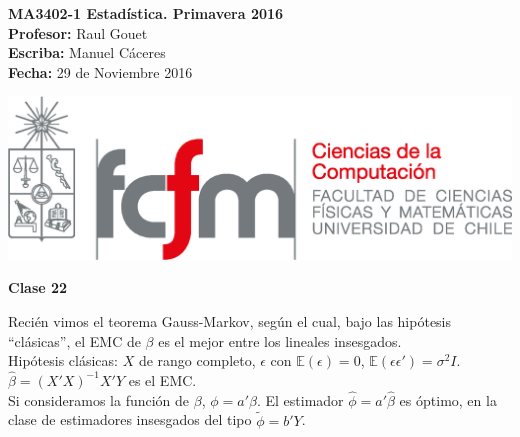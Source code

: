 \documentclass[10pt]{article}
\theoremstyle{plain}
\theoremstyle{definition}
\newcommand{\catnum}{22} %
\newcommand{\fecha}{29 de Noviembre 2016 }
\begin{document}
\vspace*{-1.2 cm}
\begin{minipage}{0.6\textwidth}
\begin{flushleft}
\hspace*{-0.5cm}\textbf{MA3402-1 Estadística. Primavera 2016}\\
\hspace*{-0.5cm}\textbf{Profesor:} Raul Gouet\\
\hspace*{-0.5cm}\textbf{Escriba:} Manuel Cáceres\\
\hspace*{-0.5cm}\textbf{Fecha:} \fecha
\end{flushleft}
\end{minipage}
\begin{minipage}{0.36\textwidth}
\begin{flushright}
\includegraphics[scale=0.3]{imagenes/fcfm_dcc}
\end{flushright}
\end{minipage}
\bigskip

\begin{center}
\LARGE\textbf{Clase \catnum}
\end{center}
Recién vimos el teorema Gauss-Markov, según el cual, bajo las hipótesis ``clásicas'', el EMC de $\beta$ es el mejor entre los lineales insesgados.\\

Hipótesis clásicas: $X$ de rango completo, $\epsilon$ con $\mathbb{E}(\epsilon) = 0$, $\mathbb{E}(\epsilon\epsilon')=\sigma^2I$.\\

$\hat{\beta} = (X'X)^{-1}X'Y$ es el EMC.\\

Si consideramos la función de $\beta$, $\phi = a'\beta$. El estimador $\hat{\phi} = a'\hat{\beta}$ es óptimo, en la clase de estimadores insesgados del tipo $\tilde{\phi} = b'Y$.\\
\end{document}
